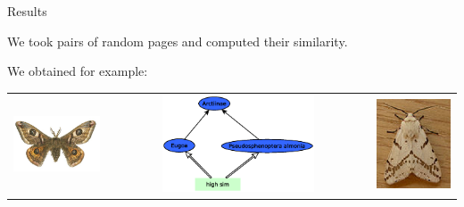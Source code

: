 \documentclass[xcolor=dvipsnames]{beamer}
\begin{document}
\begin{frame}{Results}

We took pairs of random pages and computed their similarity. 

We obtained for example: 

\begin{center}
\begin{minipage}{\textwidth}
\begin{tabular}{c c c}
\includegraphics[scale=0.4]{media/moth2.eps} 
& \includegraphics[width=0.6\textwidth, height=0.4\paperheight]{media/moths.eps}
& \includegraphics[scale=0.4]{media/moth1.eps}\\

\end{tabular}
\end{minipage}
\end{center}

\end{frame}
\end{document}
